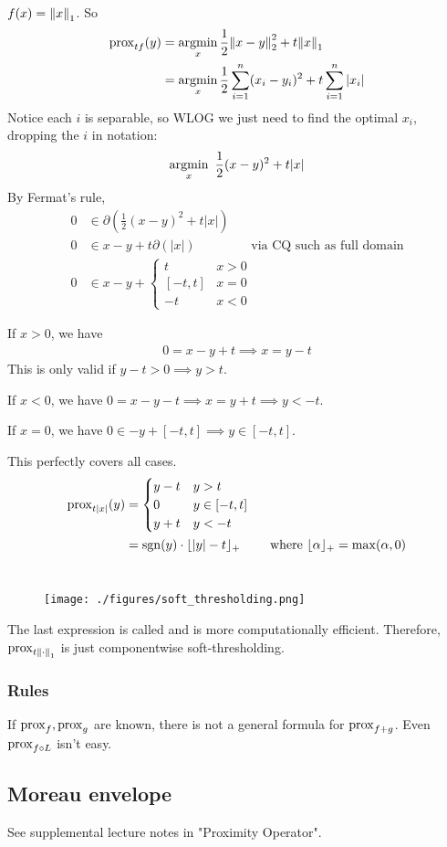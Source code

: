 \documentclass[class=article,crop=false]{standalone}
\begin{document}
\begin{eg}
	$ f(x) = {\left\lVert{ x}\right\rVert}_1 $. So
	\begin{align*}
		\operatorname{prox}_{tf} (y) &= \operatorname*{argmin}_x \frac{1}{2}{\left\lVert{ x-y}\right\rVert}_2 ^2 + t{\left\lVert{ x}\right\rVert}_1 \\
			       &= \operatorname*{argmin}_x \frac{1}{2} \sum_{ i= 1}^{ n} (x_i-y_i)^2 + t \sum_{ i= 1}^{ n} |x_i|
	\end{align*}
	Notice each $ i$ is separable, so WLOG we just need to find the optimal $ x_i$, dropping the $ i$ in notation:
	 \begin{align*}
		 \operatorname*{argmin}_x \ \frac{1}{2}(x-y)^2 + t|x| 
	\end{align*}
	By Fermat's rule,
	\begin{align*}
		0 &\in \partial \left(\frac{1}{2}(x-y)^2 + t|x|\right)  \\
		0 &\in x-y + t \partial (|x|) \qquad \qquad    \text{ via CQ such as full domain} \\
		0 &\in x-y + \begin{cases}
			t & x > 0\\
			[-t,t] & x = 0\\
			-t & x<0
		\end{cases} 
	\end{align*}
	\begin{case}[1]
		If $ x>0$, we have
		 \begin{align*}
			0 = x-y + t \implies x = y-t
		\end{align*}
		This is only valid if $ y-t > 0 \implies y > t$.
	\end{case}
	\begin{case}[2]
	If $ x<0$, we have  $ 0 = x-y-t \implies x = y+ t \implies y < -t$.
	\end{case}
	\begin{case}[3]
		If $ x = 0$, we have  $ 0 \in -y + [-t,t] \implies y \in [-t,t]$. 
	\end{case}
	This perfectly covers all cases.
	\begin{align*}
		\operatorname{prox}_{t|x|} (y) &=
		\begin{cases}
			y-t & y> t\\
			0 & y \in [-t,t]\\
			y+t & y<-t
		\end{cases}\\
				 &= \operatorname{sgn}(y) \cdot \lfloor |y|-t \rfloor_{+} \qquad  \text{ where } \lfloor \alpha \rfloor_+ = \max (\alpha,0) 
	\end{align*}
	~\begin{figure}[H]
		\centering
		\texttt{[image: ./figures/soft\_thresholding.png]}
	\end{figure}
	The last expression is called  and is more computationally efficient. Therefore, $ \operatorname{prox}_{t {\left\lVert{ \cdot }\right\rVert}_1 }$ is just componentwise soft-thresholding.
\end{eg}

\subsubsection{Rules}
If $ \operatorname{prox}_f,\operatorname{prox}_g$ are known, there is not a general formula for  $ \operatorname{prox}_{f+g}$. Even $ \operatorname{prox}_{f\circ L}$ isn't easy.

\subsection{Moreau envelope}
See supplemental lecture notes in "Proximity Operator".
\end{document}
